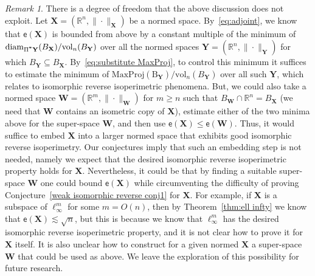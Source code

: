 \documentclass[11pt,reqno]{amsart}
\renewcommand{\le}{\leqslant}
\renewcommand{\ge}{\geqslant}
\newcommand{\diam}{\mathrm{diam}}
\newcommand{\X}{\mathbf X}
\newcommand{\Y}{\mathbf Y}
\newcommand{\R}{\mathbb R}
\theoremstyle{remark}
\newtheorem{remark}[theorem]{Remark}
\renewcommand{\subset}{\subseteq}
\newcommand{\ee}{\mathsf{e}}
\newcommand{\vol}{\mathrm{vol}}
\renewcommand{\1}{\mathbf 1}
\begin{document}
\begin{remark} There is a degree of freedom that the above discussion does not exploit. Let $\X=(\R^n,\|\cdot\|_\X)$ be a normed space. By~\eqref{eq:adjoint}, we know that $\ee(\X)$ is bounded from above by a constant multiple of the minimum of $\diam_{\Pi^{\textbf *} \Y}(B_\X)/\vol_n(B_{\Y})$ over all the normed spaces  $\Y=(\R^n,\|\cdot\|_\Y)$ for which $B_\Y\subset B_\X$.  By~\eqref{eq:substitute MaxProj}, to control this minimum it suffices to estimate the minimum of $\mathrm{MaxProj(B_\Y)}/\vol_n(B_\Y)$ over all such $\Y$, which relates to isomorphic reverse isoperimetric phenomena. But, we could also take a normed space $\mathbf{W}=(\R^m,\|\cdot\|_\mathbf{W})$ for $m\ge n$ such that  $B_{\mathbf{W}}\cap \R^n=B_\X$ (we need that $\mathbf{W}$ contains an isometric copy of $\X$), estimate either of the two minima above  for the super-space  $\mathbf{W}$, and then use $\ee(\X)\le  \ee(\mathbf{W})$. Thus, it would suffice to embed $\X$ into a larger normed space that exhibits good isomorphic reverse isoperimetry. Our conjectures imply that such an embedding step is not needed, namely we expect that the desired isomorphic reverse isoperimetric property holds for  $\X$. Nevertheless, it could be that by finding a suitable super-space $\mathbf{W}$ one could bound $\ee(\X)$ while circumventing the difficulty of proving Conjecture~\ref{weak isomorphic reverse conj1} for $\X$. For example, if $\X$ is a subspace of $\ell_\infty^m$ for some $m=O(n)$, then by Theorem~\ref{thm:ell infty} we know that $\ee(\X)\lesssim \sqrt{n}$, but  this is because we know that $\ell_\infty^m$ has the desired isomorphic reverse isoperimetric property, and it is not clear how to prove it for $\X$ itself. It is also unclear how to construct for a given normed $\X$  a super-space $\mathbf{W}$ that could be used as above. We leave the exploration of this possibility for future research.
\end{remark}
\end{document}
